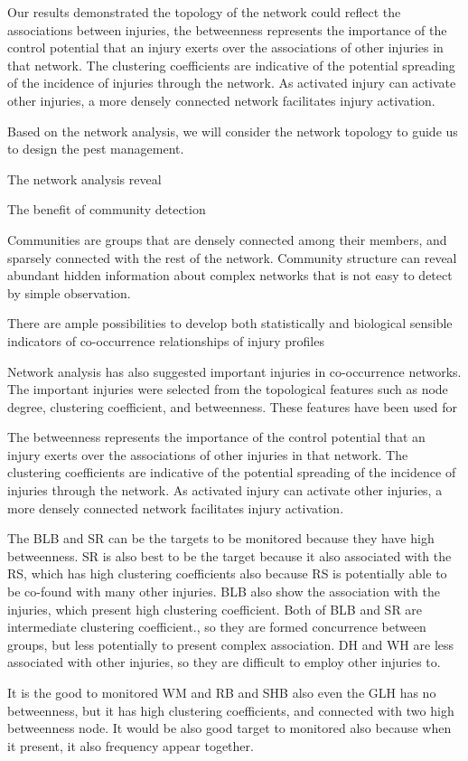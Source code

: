 Our results demonstrated the topology of the network could reflect the associations between injuries, the betweenness represents the importance of the control potential that an injury exerts over the associations of other injuries in that network. The clustering coefficients are indicative of the potential spreading of the incidence of injuries through the network. As activated injury can activate other injuries, a more densely connected network facilitates injury activation. 

Based on the network analysis, we will consider the network topology to guide us to design the pest management.

The network analysis reveal

The benefit of community detection 

Communities are groups that are densely connected among their members, and sparsely connected with the rest of the network. Community structure can reveal abundant hidden information about complex networks that is not easy to detect by simple observation. 

There are ample possibilities to develop both statistically and biological sensible indicators of co-occurrence relationships of injury profiles


Network analysis has also suggested important injuries in co-occurrence networks. The important injuries were selected from the topological features such as node degree, clustering coefficient, and betweenness. These features have been used for 

The betweenness represents the importance of the control potential that an injury exerts over the associations of other injuries in that network. The clustering coefficients are indicative of the potential spreading of the incidence of injuries through the network. As activated injury can activate other injuries, a more densely connected network facilitates injury activation. \cite{Williams_2014_demonstrating}


The BLB and SR can be the targets to be monitored because they have high betweenness. SR is also best to be the target because it also associated with the RS, which has high clustering coefficients also because RS is potentially able to be co-found with many other injuries.  BLB also show the association with the injuries, which present high clustering coefficient. Both of BLB and SR are intermediate clustering coefficient., so they are formed concurrence between groups, but less potentially to present complex association. DH and WH are less associated with other injuries, so they are difficult to employ other injuries to. 

It is the good to monitored WM and RB  and SHB also even the GLH has no betweenness, but it has high clustering coefficients, and connected with two high betweenness node. It would be also good target to monitored also because when it present, it also frequency appear together. 




